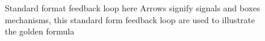 \begin{figure}[H]
\begin{tikzpicture}[x=0.75pt,y=0.75pt,yscale=-1,xscale=1]
\end{tikzpicture}
    \caption{Standard format feedback loop here Arrows signify signals and boxes mechanisms, this standard form feedback loop are used to illustrate the golden formula}
    \label{fig:FeedbackLoop}
\end{figure}